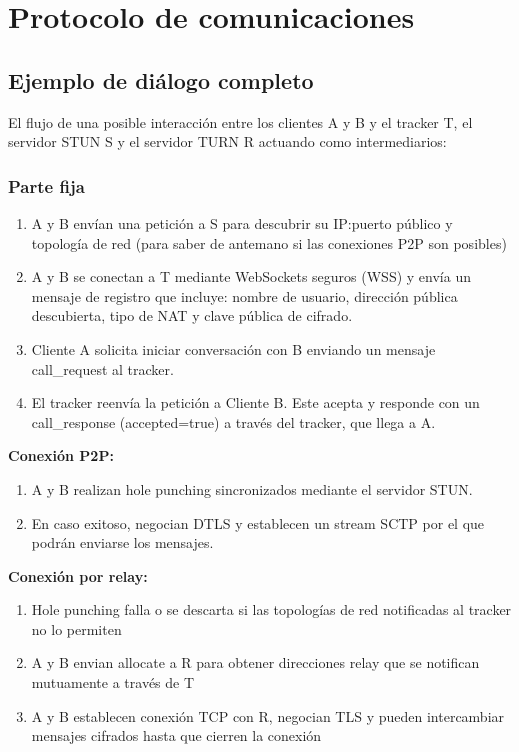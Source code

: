 \documentclass{article}
\begin{document}
\section{Protocolo de comunicaciones}
    \subsection{Ejemplo de diálogo completo}
    
    El flujo de una posible interacción entre los clientes A y B y el tracker T, el servidor STUN S y el servidor TURN R actuando como intermediarios:

    \subsubsection{Parte fija}

    \begin{enumerate}
        \item A y B envían una petición a S para descubrir su IP:puerto público y topología de red (para saber de antemano si las conexiones P2P son posibles)
        \item A y B se conectan a T mediante WebSockets seguros (WSS) y envía un mensaje de registro que incluye: nombre de usuario, dirección pública descubierta, tipo de NAT y clave pública de cifrado.
        \item Cliente A solicita iniciar conversación con B enviando un mensaje call_request al tracker.
        \item El tracker reenvía la petición a Cliente B. Este acepta y responde con un call_response (accepted=true) a través del tracker, que llega a A.
    \end{enumerate}
    
    \textbf{Conexión P2P:}
    \begin{enumerate}[label=\arabic*., start=6]
        \item A y B realizan hole punching sincronizados mediante el servidor STUN.
        \item En caso exitoso, negocian DTLS y establecen un stream SCTP por el que podrán enviarse los mensajes.
    \end{enumerate}

    \textbf{Conexión por relay:}
    \begin{enumerate}[label=\arabic*., start=6]
        \item Hole punching falla o se descarta si las topologías de red notificadas al tracker no lo permiten
        \item A y B envian allocate a R para obtener direcciones relay que se notifican mutuamente a través de T
        \item A y B establecen conexión TCP con R, negocian TLS y pueden intercambiar mensajes cifrados hasta que cierren la conexión
    \end{enumerate}
\end{document}
